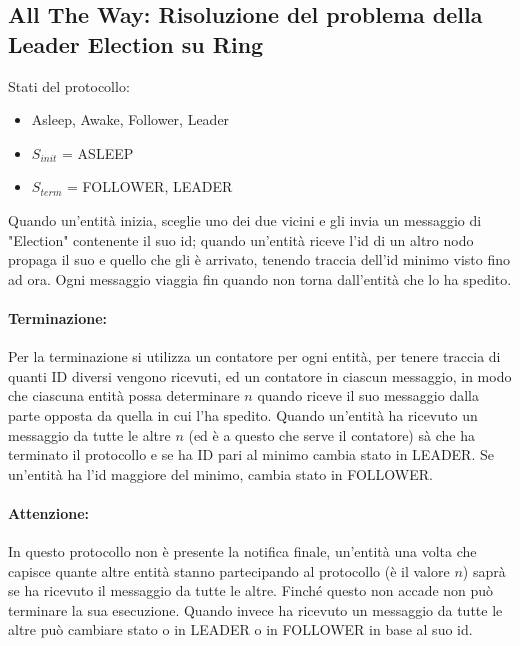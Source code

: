 \subsection{All The Way: Risoluzione del problema della Leader Election su Ring}
Stati del protocollo:
\begin{itemize}
    \item Asleep, Awake, Follower, Leader
    \item $S_{init}$ = ASLEEP
    \item $S_{term}$ = FOLLOWER, LEADER
\end{itemize}
Quando un'entità inizia, sceglie uno dei due vicini e gli invia un messaggio di
"Election" contenente il suo id; quando un'entità riceve l'id di un altro nodo
propaga il suo e quello che gli è arrivato, tenendo traccia dell'id minimo visto
fino ad ora. Ogni messaggio viaggia fin quando non torna dall'entità che lo ha
spedito.

\paragraph{Terminazione:} Per la terminazione si utilizza un contatore per ogni
entità, per tenere traccia di quanti ID diversi vengono ricevuti, ed un
contatore in ciascun messaggio, in modo che ciascuna entità possa determinare
$n$ quando riceve il suo messaggio dalla parte opposta da quella in cui l'ha
spedito. Quando un'entità ha ricevuto un messaggio da tutte le altre $n$ (ed è a
questo che serve il contatore) sà che ha terminato il protocollo e se ha ID pari
al minimo cambia stato in LEADER. Se un'entità ha l'id maggiore del minimo,
cambia stato in FOLLOWER.

\paragraph{Attenzione:} In questo protocollo non è presente la notifica finale,
un'entità una volta che capisce quante altre entità stanno partecipando al
protocollo (è il valore $n$) saprà se ha ricevuto il messaggio da tutte le
altre. Finché questo non accade non può terminare la sua esecuzione. Quando
invece ha ricevuto un messaggio da tutte le altre può cambiare stato o in LEADER
o in FOLLOWER in base al suo id.

